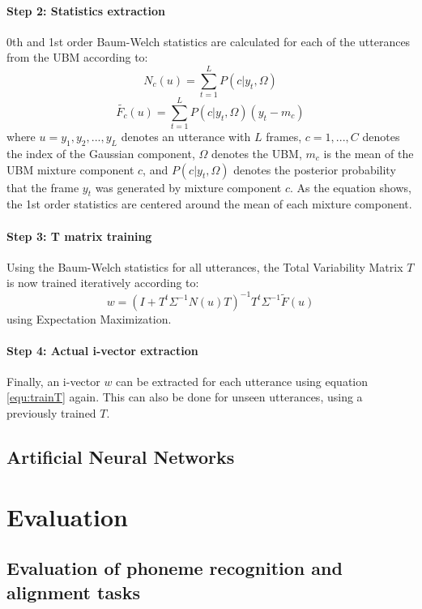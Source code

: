 \paragraph*{Step 2: Statistics extraction} 0th and 1st order Baum-Welch statistics are calculated for each of the utterances from the UBM according to:
\begin{equation}
N_c(u)=\sum_{t=1}^{L} P(c|y_t,\Omega)
\end{equation}
\begin{equation}
\widetilde{F_c}(u)=\sum_{t=1}^{L} P(c|y_t,\Omega)(y_t-m_c)
\end{equation}
where $u={y_1,y_2,...,y_L}$ denotes an utterance with $L$ frames, $c=1,...,C$ denotes the index of the Gaussian component, $\Omega$ denotes the UBM,  $m_c$ is the mean of the UBM mixture component $c$, and $P(c|y_t,\Omega)$ denotes the posterior probability that the frame $y_t$ was generated by mixture component $c$. As the equation shows, the 1st order statistics are centered around the mean of each mixture component.\\
\paragraph*{Step 3: T matrix training}
Using the Baum-Welch statistics for all utterances, the Total Variability Matrix $T$ is now trained iteratively according to:
\begin{equation}\label{equ:trainT}
w = (I+T^t \Sigma^{-1} N (u) T)^{-1}T^t \Sigma^{-1} \widetilde{F}(u)
\end{equation}
using Expectation Maximization.
\paragraph*{Step 4: Actual i-vector extraction}
Finally, an i-vector $w$ can be extracted for each utterance using equation \ref{equ:trainT} again. This can also be done for unseen utterances, using a previously trained $T$.


\subsection{Artificial Neural Networks}

\section{Evaluation}
\subsection{Evaluation of phoneme recognition and alignment tasks}
